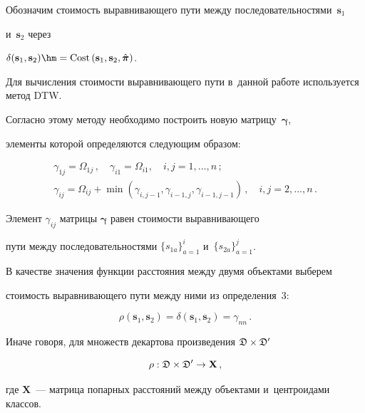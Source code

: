 




Обозначим стоимость выравнивающего пути между последовательностями~$\mathbf{s}_1$ 

и~$\mathbf{s}_2$ через 

$\delta(\mathbf{s}_1,\mathbf{s}_2) \hm= 

\mathrm{Cost}\left(\mathbf{s}_1,\mathbf{s}_2,\hat{\boldsymbol{\pi}}\right)$.



Для вычисления стоимости выравнивающего пути в~данной работе используется метод DTW. 

Согласно этому методу необходимо построить новую матрицу~$\boldsymbol{\gamma}$, 

элементы которой определяются следующим образом:

\begin{gather*}

\gamma_{1j} = \Omega_{1j}\,,\quad \gamma_{i1} = \Omega_{i1},\quad i,j = 1, \dots , n\,;

\\

\gamma_{ij} = \Omega_{ij}+\min(\gamma_{i,j-1},\gamma_{i-1,j},\gamma_{i-1,j-1})\,,\quad 

i,j = 2 , \dots , n\,.

\end{gather*}



Элемент $\gamma_{ij}$ матрицы $\boldsymbol{\gamma}$ равен стоимости выравнивающего 

пути между последовательностями $\{{s}_{1a}\}_{a=1}^i$ и~$\{{s}_{2a}\}_{a=1}^j$.



В качестве значения функции расстояния между двумя объектами выберем 

стоимость выравнивающего пути между ними из определения~3: 

$$

\rho(\mathbf{s}_1,\mathbf{s}_2)=\delta(\mathbf{s}_1,\mathbf{s}_2) = \gamma_{nn}\,.

$$

Иначе говоря, для множеств декартова произведения $\mathfrak{D}\times\mathfrak{D}'$ 

$$

{\rho}: \fD\times\fD'\rightarrow \mathbf{X}\,,

$$ 

где $\mathbf{X}$~--- матрица попарных расстояний между объектами и~центроидами классов.

